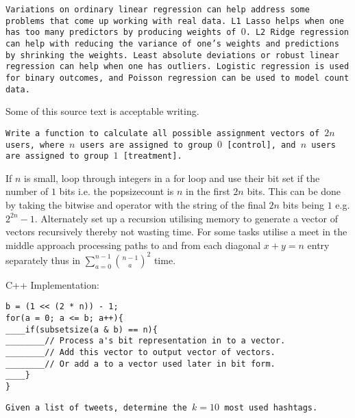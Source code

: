 \texttt{Variations on ordinary linear regression can help address some problems that come up working with real data. L1 Lasso helps when one has too many predictors by producing weights of $0$. L2 Ridge regression can help with reducing the variance of one's weights and predictions by shrinking the weights. Least absolute deviations or robust linear regression can help when one has outliers. Logistic regression is used for binary outcomes, and Poisson regression can be used to model count data.}

Some of this source text is acceptable writing.

\texttt{Write a function to calculate all possible assignment vectors of $2n$ users, where $n$ users are assigned to group $0$ [control], and $n$ users are assigned to group $1$ [treatment].}

If $n$ is small, loop through integers in a for loop and use their bit set if the number of $1$ bits i.e. the popsizecount is $n$ in the first $2n$ bits. This can be done by taking the bitwise and operator with the string of the final $2n$ bits being $1$ e.g. $2^{2n}-1$. Alternately set up a recursion utilising memory to generate a vector of vectors recursively thereby not wasting time. For some tasks utilise a meet in the middle approach processing paths to and from each diagonal $x+y=n$ entry separately thus in $\sum_{a=0}^{n-1} \binom{n-1}{a}^2$ time.

C++ Implementation:

\begin{verbatim}
b = (1 << (2 * n)) - 1;
for(a = 0; a <= b; a++){
____if(subsetsize(a & b) == n){
________// Process a's bit representation in to a vector.
________// Add this vector to output vector of vectors.
________// Or add a to a vector used later in bit form.
____}
}
\end{verbatim}

\texttt{Given a list of tweets, determine the $k=10$ most used hashtags.}

